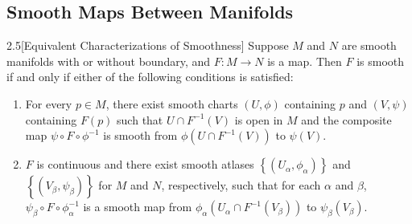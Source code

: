 \subsection{Smooth Maps Between Manifolds}

\begin{prop}{2.5}[Equivalent Characterizations of Smoothness]
    Suppose \( M \) and \( N \) are smooth manifolds with or without boundary, and \( F: M \to N \) is a map. Then \( F \) is smooth if and only if either of the following conditions is satisfied:
    \begin{enumerate}[itemsep=0pt,label={(\alph*)}]
        \item For every \( p \in M \), there exist smooth charts \( (U, \phi) \) containing \( p \) and \( (V, \psi) \) containing \( F(p) \) such that \( U \cap F^{-1}(V) \) is open in \( M \) and the composite map \( \psi \circ F \circ \phi^{-1} \) is smooth from \( \phi(U \cap F^{-1}(V)) \) to \( \psi(V) \).
        \item \( F \) is continuous and there exist smooth atlases \( {\left\{ (U_{\alpha}, \phi_{\alpha}) \right\}} \) and \( {\left\{ (V_{\beta}, \psi_{\beta}) \right\}} \) for \( M \) and \( N \), respectively, such that for each \( \alpha \) and \( \beta \), \( \psi_{\beta} \circ F \circ \phi_{\alpha}^{-1} \) is a smooth map from \( \phi_{\alpha}(U_{\alpha} \cap F^{-1}(V_{\beta})) \) to \( \psi_{\beta}(V_{\beta}) \).
    \end{enumerate}
\end{prop}

